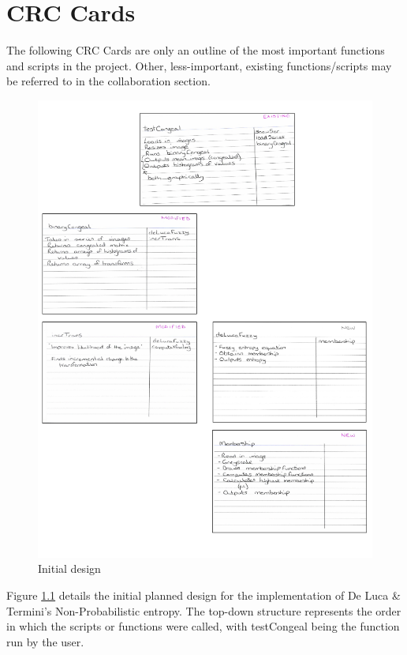 \chapter{CRC Cards}
\label{appendix:crc-cards}

The following \acrshort{CRC} Cards are only an outline of the most important functions and scripts in the project. Other, less-important, existing functions/scripts may be referred to in the collaboration section.

\begin{figure}[H]
  \center
  \includegraphics[scale=0.5]{Appendix4/imgs/initial.png}
  \caption{Initial design}
  \label{fig:initial-design}
\end{figure}

Figure \ref{fig:initial-design} details the initial planned design for the implementation of De Luca \& Termini's Non-Probabilistic entropy. The top-down structure represents the order in which the scripts or functions were called, with testCongeal being the function run by the user.

